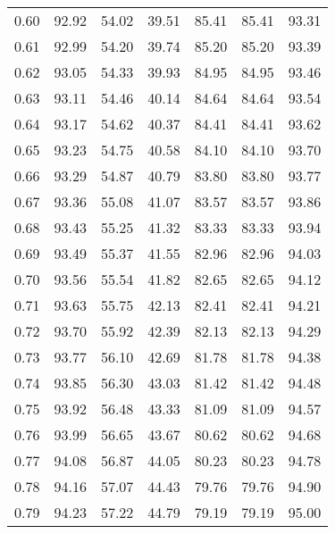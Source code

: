 \begin{tabular}{|c|c|c|c|c|c|c|}
      0.60 &     92.92 &     54.02 &      39.51 &   85.41 &      85.41 &         93.31 \\
      0.61 &     92.99 &     54.20 &      39.74 &   85.20 &      85.20 &         93.39 \\
      0.62 &     93.05 &     54.33 &      39.93 &   84.95 &      84.95 &         93.46 \\
      0.63 &     93.11 &     54.46 &      40.14 &   84.64 &      84.64 &         93.54 \\
      0.64 &     93.17 &     54.62 &      40.37 &   84.41 &      84.41 &         93.62 \\
      0.65 &     93.23 &     54.75 &      40.58 &   84.10 &      84.10 &         93.70 \\
      0.66 &     93.29 &     54.87 &      40.79 &   83.80 &      83.80 &         93.77 \\
      0.67 &     93.36 &     55.08 &      41.07 &   83.57 &      83.57 &         93.86 \\
      0.68 &     93.43 &     55.25 &      41.32 &   83.33 &      83.33 &         93.94 \\
      0.69 &     93.49 &     55.37 &      41.55 &   82.96 &      82.96 &         94.03 \\
      0.70 &     93.56 &     55.54 &      41.82 &   82.65 &      82.65 &         94.12 \\
      0.71 &     93.63 &     55.75 &      42.13 &   82.41 &      82.41 &         94.21 \\
      0.72 &     93.70 &     55.92 &      42.39 &   82.13 &      82.13 &         94.29 \\
      0.73 &     93.77 &     56.10 &      42.69 &   81.78 &      81.78 &         94.38 \\
      0.74 &     93.85 &     56.30 &      43.03 &   81.42 &      81.42 &         94.48 \\
      0.75 &     93.92 &     56.48 &      43.33 &   81.09 &      81.09 &         94.57 \\
      0.76 &     93.99 &     56.65 &      43.67 &   80.62 &      80.62 &         94.68 \\
      0.77 &     94.08 &     56.87 &      44.05 &   80.23 &      80.23 &         94.78 \\
      0.78 &     94.16 &     57.07 &      44.43 &   79.76 &      79.76 &         94.90 \\
      0.79 &     94.23 &     57.22 &      44.79 &   79.19 &      79.19 &         95.00 \\

\end{tabular}
